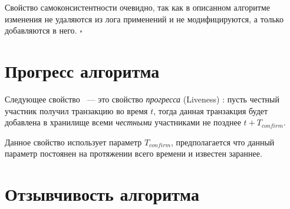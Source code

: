 Свойство самоконсистентности очевидно, так как в описанном алгоритме изменения не удаляются из лога применений и не модифицируются, а только добавляются в него. $\square$

\section{Прогресс алгоритма}
\noindent Следующее свойство ~--- это свойство \textit{прогресса} (Liveness) \cite{hybrid-consensus}:
пусть честный участник получил транзакцию во время $t$, тогда данная транзакция будет добавлена в хранилище всеми \textit{честными} участниками не позднее $t + T_{confirm}$.

Данное свойство использует параметр $T_{confirm}$, предполагается что данный параметр постоянен на протяжении всего времени и известен зараннее.

\section{Отзывчивость алгоритма}